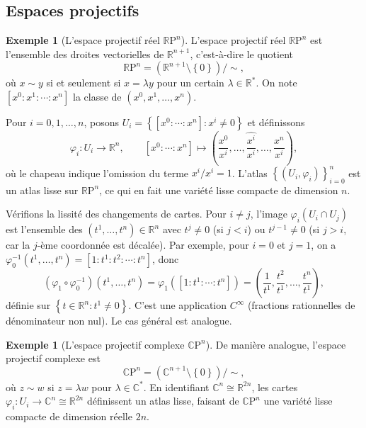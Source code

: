 \documentclass[12pt,a4paper,openany]{book}
\theoremstyle{definition}
\newtheorem{exemple}[definition]{Exemple}
\theoremstyle{plain}
\theoremstyle{remark}
\newcommand{\R}{\mathbb{R}}
\newcommand{\C}{\mathbb{C}}
\newcommand{\RP}{\mathbb{R}\mathrm{P}}
\newcommand{\CP}{\mathbb{C}\mathrm{P}}
\newcommand{\set}[1]{\left\{#1\right\}}
\begin{document}
\subsection{Espaces projectifs}

\begin{exemple}[L'espace projectif réel $\RP^n$]\label{ex:RPn}
\index{RPn@$\RP^n$}
L'espace projectif réel $\RP^n$ est l'ensemble des droites vectorielles de
$\R^{n+1}$, c'est-à-dire le quotient
\[
    \RP^n = (\R^{n+1} \setminus \set{0}) / {\sim},
\]
où $x \sim y$ si et seulement si $x = \lambda y$ pour un certain $\lambda \in
\R^*$. On note $[x^0 : x^1 : \cdots : x^n]$ la classe de $(x^0, x^1, \ldots,
x^n)$.

Pour $i = 0, 1, \ldots, n$, posons $U_i = \set{[x^0 : \cdots : x^n] : x^i
\neq 0}$ et définissons
\[
    \varphi_i \colon U_i \longrightarrow \R^n, \qquad
    [x^0 : \cdots : x^n] \longmapsto
    \left(\frac{x^0}{x^i}, \ldots, \widehat{\frac{x^i}{x^i}}, \ldots,
    \frac{x^n}{x^i}\right),
\]
où le chapeau indique l'omission du terme $x^i/x^i = 1$. L'atlas $\set{(U_i,
\varphi_i)}_{i=0}^n$ est un atlas lisse sur $\RP^n$, ce qui en fait une variété
lisse compacte de dimension $n$.

Vérifions la lissité des changements de cartes. Pour $i \neq j$, l'image
$\varphi_i(U_i \cap U_j)$ est l'ensemble des $(t^1, \ldots, t^n) \in \R^n$
avec $t^j \neq 0$ (si $j < i$) ou $t^{j-1} \neq 0$ (si $j > i$, car la
$j$-ème coordonnée est décalée). Par exemple, pour $i = 0$ et $j = 1$, on a
$\varphi_0^{-1}(t^1, \ldots, t^n) = [1 : t^1 : t^2 : \cdots : t^n]$, donc
\[
    (\varphi_1 \circ \varphi_0^{-1})(t^1, \ldots, t^n)
    = \varphi_1([1 : t^1 : \cdots : t^n])
    = \left(\frac{1}{t^1}, \frac{t^2}{t^1}, \ldots, \frac{t^n}{t^1}\right),
\]
définie sur $\set{t \in \R^n : t^1 \neq 0}$. C'est une application $C^\infty$
(fractions rationnelles de dénominateur non nul). Le cas général est analogue.
\end{exemple}

\begin{exemple}[L'espace projectif complexe $\CP^n$]\label{ex:CPn}
\index{CPn@$\CP^n$}
De manière analogue, l'espace projectif complexe est
\[
    \CP^n = (\C^{n+1} \setminus \set{0}) / {\sim},
\]
où $z \sim w$ si $z = \lambda w$ pour $\lambda \in \C^*$. En identifiant $\C^n
\cong \R^{2n}$, les cartes $\varphi_i \colon U_i \to \C^n \cong \R^{2n}$
définissent un atlas lisse, faisant de $\CP^n$ une variété lisse compacte de
dimension réelle $2n$.
\end{exemple}
\end{document}
